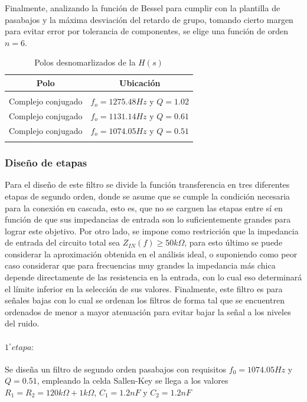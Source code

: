 Finalmente, analizando la funci\'on de Bessel para cumplir con la plantilla de pasabajos y la m\'axima desviaci\'on del retardo de grupo, tomando cierto margen para evitar error por tolerancia de componentes,
se elige una funci\'on de orden $n = 6$.

\begin{table}[H]
	\centering
	\begin{tabular}{c | c}
		Polo & Ubicaci\'on \\
		\hline \\
		Complejo conjugado & $f_o = 1275.48Hz$ y $Q = 1.02$\\
		Complejo conjugado & $f_o = 1131.14Hz$ y $Q = 0.61$\\
		Complejo conjugado & $f_o = 1074.05Hz$ y $Q = 0.51$\\
		\\ \hline
	\end{tabular}
	\caption{Polos desnomarlizados de la $H(s)$}
\end{table}

\subsubsection{Dise\~no de etapas}
Para el dise\~no de este filtro se divide la funci\'on transferencia en tres diferentes etapas de segundo orden, donde se asume que se cumple la condici\'on necesaria para la conexi\'on en cascada,
esto es, que no se carguen las etapas entre s\'i en funci\'on de que sus impedancias de entrada son lo suficientemente grandes para lograr este objetivo. Por otro lado, se impone como restricci\'on que la impedancia de entrada
del circuito total sea $Z_{IN}(f) \geq 50k \Omega$, para esto \'ultimo se puede considerar la aproximaci\'on obtenida en el an\'alisis ideal, o suponiendo como peor caso considerar que para frecuencias muy grandes la impedancia m\'as chica
depende directamente de las resistencia en la entrada, con lo cual eso determinar\'a el l\'imite inferior en la selecci\'on de sus valores. Finalmente, este filtro es para se\~nales bajas con lo cual se ordenan los filtros de forma tal que se encuentren ordenados
de menor a mayor atenuaci\'on para evitar bajar la se\~nal a los niveles del ruido.

\paragraph{$1^{\circ} etapa:$} Se dise\~na un filtro de segundo orden pasabajos con requisitos $f_0 = 1074.05Hz$ y $Q = 0.51$, empleando la celda Sallen-Key se llega a los valores $R_1 = R_2 = 120k \Omega + 1k\Omega$, $C_1 = 1.2nF$ y $C_2 = 1.2nF$

